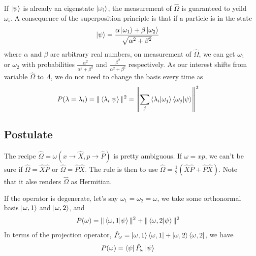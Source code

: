 \documentclass[12pt,a4paper]{report}
\newcommand{\rom}[1]{\Romannum{#1}}
\begin{document}
If $\ket{\psi}$ is already an eigenstate $\ket{\omega_i}$, the measurement of $\hat{\Omega}$ is guaranteed to yeild $\omega_i$. A consequence of the superposition principle
is that if a particle is in the state
\begin{equation*}
    \ket{\psi} = \frac{\alpha \ket{\omega_1} + \beta \ket{\omega_2}}{\sqrt{\alpha^2 + \beta^2}}
\end{equation*}
where $\alpha$ and $\beta$ are arbitrary real numbers, on measurement of $\hat{\Omega}$, we can get $\omega_1$ or $\omega_2$ with probabilities $\frac{\alpha^2}{\alpha^2 + \beta^2}$ and $\frac{\beta^2}{\alpha^2 + \beta^2}$ respectively.
As our interest shifts from variable $\hat{\Omega}$ to $\hat{\Lambda}$, we do not need to change the basis every time as
\begin{equation*}
    P(\lambda=\lambda_i) = \| \bra{\lambda_i}\ket{\psi} \|^2 = \left\| \sum_{j} \bra{\lambda_i}\ket{\omega_j}\bra{\omega_j}\ket{\psi} \right\|^2
\end{equation*}
\newpage
\subsection{Postulate \rom{2}}

The recipe $\hat{\Omega} = \omega(x \to \hat{X}, p \to \hat{P})$ is pretty ambiguous. If $\omega = xp$, we can't be sure if $\hat{\Omega} = \hat{X}\hat{P}$ or $\hat{\Omega} = \hat{P}\hat{X}$.
The rule is then to use $\hat{\Omega} = \frac{1}{2}(\hat{X}\hat{P} + \hat{P}\hat{X})$. Note that it alse renders $\hat{\Omega}$ as Hermitian.

If the operator is degenerate, let's say $\omega_1=\omega_2=\omega$, we take some orthonormal basis $\ket{\omega, 1}$ and $\ket{\omega, 2}$, and
\begin{equation*}
    P(\omega) = \|\bra{\omega, 1}\ket{\psi}\|^2 + \|\bra{\omega, 2}\ket{\psi}\|^2
\end{equation*}
In terms of the projection operator, $\hat{P}_\omega = \ket{\omega, 1}\bra{\omega, 1} + \ket{\omega, 2}\bra{\omega, 2}$, we have
\begin{equation*}
    P(\omega) = \bra{\psi}\hat{P}_\omega\ket{\psi}
\end{equation*}
\end{document}
